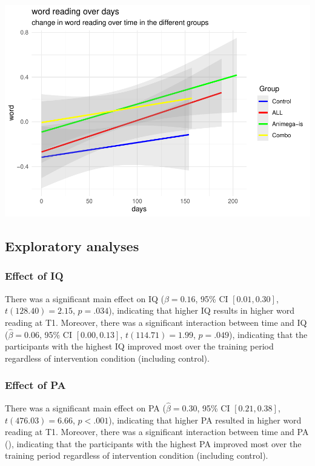 \documentclass[
  english,
  ,man]{apa6}
\begin{document}
\includegraphics{Effects_of_training_files/figure-latex/word-plot-1.pdf}

\hypertarget{exploratory-analyses-1}{%
\subsection{Exploratory analyses}\label{exploratory-analyses-1}}

\hypertarget{effect-of-iq-1}{%
\subsubsection{Effect of IQ}\label{effect-of-iq-1}}

There was a significant main effect on IQ (\(\hat{\beta} = 0.16\), 95\% CI \([0.01, 0.30]\), \(t(128.40) = 2.15\), \(p = .034\)), indicating that higher IQ results in higher word reading at T1. Moreover, there was a significant interaction between time and IQ (\(\hat{\beta} = 0.06\), 95\% CI \([0.00, 0.13]\), \(t(114.71) = 1.99\), \(p = .049\)), indicating that the participants with the highest IQ improved most over the training period regardless of intervention condition (including control).

\hypertarget{effect-of-pa}{%
\subsubsection{Effect of PA}\label{effect-of-pa}}

There was a significant main effect on PA (\(\hat{\beta} = 0.30\), 95\% CI \([0.21, 0.38]\), \(t(476.03) = 6.66\), \(p < .001\)), indicating that higher PA resulted in higher word reading at T1. Moreover, there was a significant interaction between time and PA (), indicating that the participants with the highest PA improved most over the training period regardless of intervention condition (including control).
\end{document}
